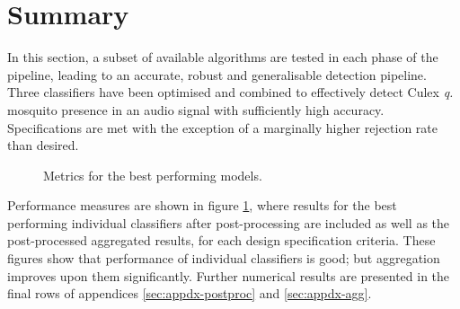 \section{Summary}
\label{sec:exp-summary}
    In this section, a subset of available algorithms are tested in each phase of the pipeline, leading to an accurate, robust and generalisable detection pipeline. Three classifiers have been optimised and combined to effectively detect Culex \textit{q.} mosquito presence in an audio signal with sufficiently high accuracy. Specifications are met with the exception of a marginally higher rejection rate than desired. 
    \begin{figure}[ht]
        \scriptsize
        \singlespacing
        \centering
        \qquad
        \caption{Metrics for the best performing models.}
        \label{fig:exp-summary-metrics}
    \end{figure}
    Performance measures are shown in figure \ref{fig:exp-summary-metrics}, where results for the best performing individual classifiers after post-processing are included as well as the post-processed aggregated results, for each design specification criteria. These figures show that performance of individual classifiers is good; but aggregation improves upon them significantly. Further numerical results are presented in the final rows of appendices \ref{sec:appdx-postproc} and \ref{sec:appdx-agg}.
    
    
    
    